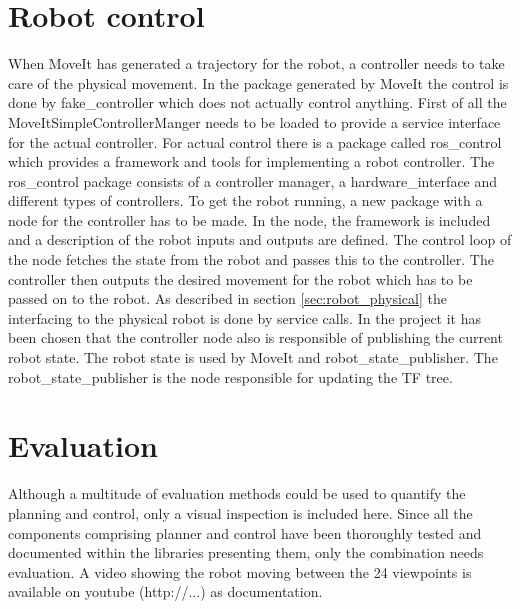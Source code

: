 \section{Robot control}
\label{sec:robot_control}
When MoveIt has generated a trajectory for the robot, a controller needs to take care of the physical movement. In the package generated by MoveIt the control is done by fake\_controller which does not actually control anything. First of all the MoveItSimpleControllerManger needs to be loaded to provide a service interface for the actual controller. For actual control there is a package called ros\_control which provides a framework and tools for implementing a robot controller. The ros\_control package consists of a controller manager, a hardware\_interface and different types of controllers. To get the robot running, a new package with a node for the controller has to be made. In the node, the framework is included and a description of the robot inputs and outputs are defined. The control loop of the node fetches the state from the robot and passes this to the controller. The controller then outputs the desired movement for the robot which has to be passed on to the robot. As described in section \ref{sec:robot_physical} the interfacing to the physical robot is done by service calls. In the project it has been chosen that the controller node also is responsible of publishing the current robot state. The robot state is used by MoveIt and robot\_state\_publisher. The robot\_state\_publisher is the node responsible for updating the TF tree. 




%

\section{Evaluation}
Although a multitude of evaluation methods could be used to quantify the planning and control, only a visual inspection is included here. Since all the components comprising planner and control have been thoroughly tested and documented within the libraries presenting them, only the combination needs evaluation. A video showing the robot moving between the 24 viewpoints is available on youtube (http://...) as documentation.\\


